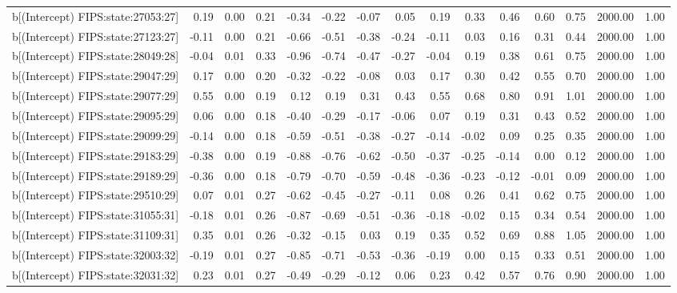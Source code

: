 \begin{table}[ht]
\begin{tabular}{rrrrrrrrrrrrrrr}
  b[(Intercept) FIPS:state:27053:27] & 0.19 & 0.00 & 0.21 & -0.34 & -0.22 & -0.07 & 0.05 & 0.19 & 0.33 & 0.46 & 0.60 & 0.75 & 2000.00 & 1.00 \\ 
  b[(Intercept) FIPS:state:27123:27] & -0.11 & 0.00 & 0.21 & -0.66 & -0.51 & -0.38 & -0.24 & -0.11 & 0.03 & 0.16 & 0.31 & 0.44 & 2000.00 & 1.00 \\ 
  b[(Intercept) FIPS:state:28049:28] & -0.04 & 0.01 & 0.33 & -0.96 & -0.74 & -0.47 & -0.27 & -0.04 & 0.19 & 0.38 & 0.61 & 0.75 & 2000.00 & 1.00 \\ 
  b[(Intercept) FIPS:state:29047:29] & 0.17 & 0.00 & 0.20 & -0.32 & -0.22 & -0.08 & 0.03 & 0.17 & 0.30 & 0.42 & 0.55 & 0.70 & 2000.00 & 1.00 \\ 
  b[(Intercept) FIPS:state:29077:29] & 0.55 & 0.00 & 0.19 & 0.12 & 0.19 & 0.31 & 0.43 & 0.55 & 0.68 & 0.80 & 0.91 & 1.01 & 2000.00 & 1.00 \\ 
  b[(Intercept) FIPS:state:29095:29] & 0.06 & 0.00 & 0.18 & -0.40 & -0.29 & -0.17 & -0.06 & 0.07 & 0.19 & 0.31 & 0.43 & 0.52 & 2000.00 & 1.00 \\ 
  b[(Intercept) FIPS:state:29099:29] & -0.14 & 0.00 & 0.18 & -0.59 & -0.51 & -0.38 & -0.27 & -0.14 & -0.02 & 0.09 & 0.25 & 0.35 & 2000.00 & 1.00 \\ 
  b[(Intercept) FIPS:state:29183:29] & -0.38 & 0.00 & 0.19 & -0.88 & -0.76 & -0.62 & -0.50 & -0.37 & -0.25 & -0.14 & 0.00 & 0.12 & 2000.00 & 1.00 \\ 
  b[(Intercept) FIPS:state:29189:29] & -0.36 & 0.00 & 0.18 & -0.79 & -0.70 & -0.59 & -0.48 & -0.36 & -0.23 & -0.12 & -0.01 & 0.09 & 2000.00 & 1.00 \\ 
  b[(Intercept) FIPS:state:29510:29] & 0.07 & 0.01 & 0.27 & -0.62 & -0.45 & -0.27 & -0.11 & 0.08 & 0.26 & 0.41 & 0.62 & 0.75 & 2000.00 & 1.00 \\ 
  b[(Intercept) FIPS:state:31055:31] & -0.18 & 0.01 & 0.26 & -0.87 & -0.69 & -0.51 & -0.36 & -0.18 & -0.02 & 0.15 & 0.34 & 0.54 & 2000.00 & 1.00 \\ 
  b[(Intercept) FIPS:state:31109:31] & 0.35 & 0.01 & 0.26 & -0.32 & -0.15 & 0.03 & 0.19 & 0.35 & 0.52 & 0.69 & 0.88 & 1.05 & 2000.00 & 1.00 \\ 
  b[(Intercept) FIPS:state:32003:32] & -0.19 & 0.01 & 0.27 & -0.85 & -0.71 & -0.53 & -0.36 & -0.19 & 0.00 & 0.15 & 0.33 & 0.51 & 2000.00 & 1.00 \\ 
  b[(Intercept) FIPS:state:32031:32] & 0.23 & 0.01 & 0.27 & -0.49 & -0.29 & -0.12 & 0.06 & 0.23 & 0.42 & 0.57 & 0.76 & 0.90 & 2000.00 & 1.00 \\ 

\end{tabular}
\end{table}

